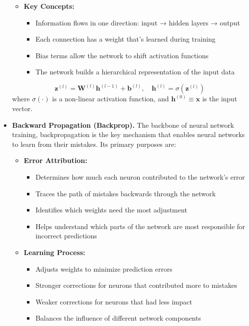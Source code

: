 \begin{itemize}
\begin{itemize}
        \item \textbf{Key Concepts:}
            \begin{itemize}
                \item Information flows in one direction: input → hidden layers → output
                \item Each connection has a weight that's learned during training
                \item Bias terms allow the network to shift activation functions
                \item The network builds a hierarchical representation of the input data
            \end{itemize}
    \end{itemize}
    
    \begin{equation}\label{eq:forward_prop}
        \mathbf{z}^{(l)} = \mathbf{W}^{(l)} \mathbf{h}^{(l-1)} + \mathbf{b}^{(l)}, \quad \mathbf{h}^{(l)} = \sigma(\mathbf{z}^{(l)})
    \end{equation}
    where $\sigma(\cdot)$ is a non-linear activation function, and $\mathbf{h}^{(0)} \equiv \mathbf{x}$ is the input vector.

    \item \textbf{Backward Propagation (Backprop).} The backbone of neural network training, backpropagation is the key mechanism that enables neural networks to learn from their mistakes. Its primary purposes are:

    \begin{itemize}
        \item \textbf{Error Attribution:}
            \begin{itemize}
                \item Determines how much each neuron contributed to the network's error
                \item Traces the path of mistakes backwards through the network
                \item Identifies which weights need the most adjustment
                \item Helps understand which parts of the network are most responsible for incorrect predictions
            \end{itemize}
            
        \item \textbf{Learning Process:}
            \begin{itemize}
                \item Adjusts weights to minimize prediction errors
                \item Stronger corrections for neurons that contributed more to mistakes
                \item Weaker corrections for neurons that had less impact
                \item Balances the influence of different network components
            \end{itemize}
            

\end{itemize}
\end{itemize}
